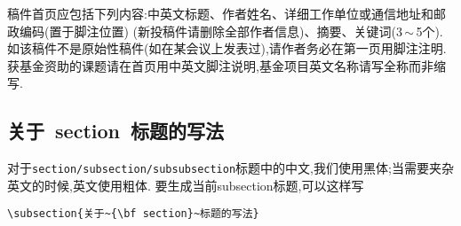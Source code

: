 \documentclass{aas}
\begin{document}
稿件首页应包括下列内容:中英文标题、作者姓名、详细工作单位或通信地址和邮政编码(置于脚注位置)
(新投稿件请删除全部作者信息)、摘要、关键词(3\,$\sim$\,5个).
如该稿件不是原始性稿件(如在某会议上发表过),请作者务必在第一页用脚注注明.
获基金资助的课题请在首页用中英文脚注说明,基金项目英文名称请写全称而非缩写.

\subsection{关于~{\bf section}~标题的写法}
对于\verb|section/subsection/subsubsection|标题中的中文,我们使用黑体;当需要夹杂英文的时候,英文使用粗体.
要生成当前subsection标题,可以这样写
\begin{verbatim}
\subsection{关于~{\bf section}~标题的写法}
\end{verbatim}
\end{document}
